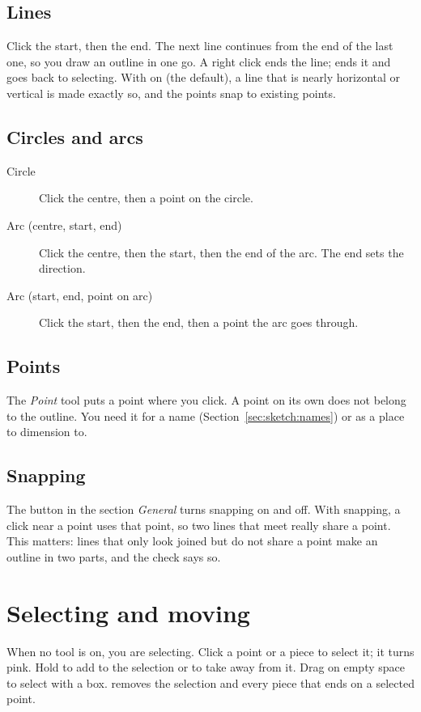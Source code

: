 \subsection{Lines}
Click the start, then the end. The next line continues from the end of the last one, so you draw an outline in one go. A right click ends the line;  ends it and goes back to selecting. With  on (the default), a line that is nearly horizontal or vertical is made exactly so, and the points snap to existing points.

\subsection{Circles and arcs}
\begin{description}
\item[Circle] Click the centre, then a point on the circle.
\item[Arc (centre, start, end)] Click the centre, then the start, then the end of the arc. The end sets the direction.
\item[Arc (start, end, point on arc)] Click the start, then the end, then a point the arc goes through.
\end{description}

\subsection{Points}
The \emph{Point} tool puts a point where you click. A point on its own does not belong to the outline. You need it for a name (Section~\ref{sec:sketch:names}) or as a place to dimension to.

\subsection{Snapping}
The button  in the section \emph{General} turns snapping on and off. With snapping, a click near a point uses that point, so two lines that meet really share a point. This matters: lines that only look joined but do not share a point make an outline in two parts, and the check says so.

\section{Selecting and moving}\label{sec:sketch:select}

When no tool is on, you are selecting. Click a point or a piece to select it; it turns pink. Hold  to add to the selection or to take away from it. Drag on empty space to select with a box.  removes the selection and every piece that ends on a selected point.

